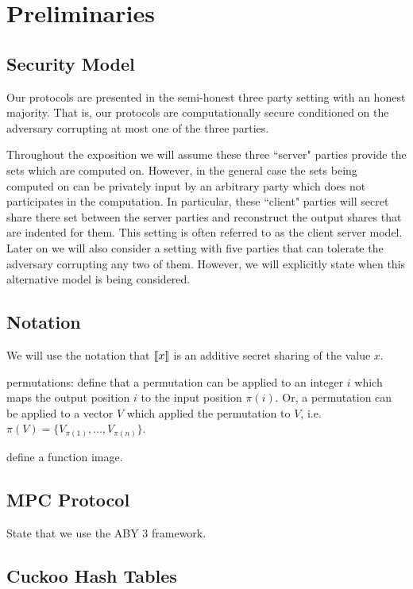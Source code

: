 \section{Preliminaries}


\subsection{Security Model}

Our protocols are presented in the semi-honest three party setting with an honest majority. That is, our protocols are computationally secure conditioned on the adversary corrupting at most one of the three parties. 



Throughout the exposition we will assume these three ``server" parties provide the sets which are computed on. However, in the general case the sets being computed on can be privately input by an arbitrary party which does not participates in the computation. In particular, these ``client" parties will secret share there set between the server parties and reconstruct the output shares that are indented for them. This setting is often referred to as the client server model\cite{aby3, secureML}. Later on we will also consider a setting with five parties that can tolerate the adversary corrupting any two of them. However, we will explicitly state when this alternative model is being considered.



\subsection{Notation}

We will use the notation that $\llbracket x\rrbracket$ is an additive secret sharing of the value $x$.

permutations: define that a permutation can be applied to an integer $i$ which maps the output position $i$ to the input position $\pi(i)$. Or, a permutation can be applied to a vector $V$ which applied the permutation to $V$, i.e. $\pi(V)=\{V_{\pi(1)}, ..., V_{\pi(n)}\}$. 


define a function image.


\subsection{MPC Protocol}

State that we use the ABY 3 framework. 

\subsection{Cuckoo Hash Tables}

